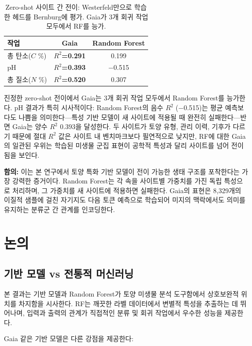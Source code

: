 \documentclass[11pt,a4paper]{article}
\begin{document}
\begin{table}[H]
\centering
\caption{Zero-shot 사이트 간 전이: Westerfeld만으로 학습한 헤드를 Bernburg에 평가. Gaia가 3개 회귀 작업 모두에서 RF를 능가.}
\label{tab:bernburg_zs}
\begin{tabular}{lcc}
\toprule
\textbf{작업} & \textbf{Gaia} & \textbf{Random Forest} \\
\midrule
총 탄소($C$ \%) & \textbf{$R^2$=0.291} & 0.199 \\
pH & \textbf{$R^2$=0.393} & $-$0.515 \\
총 질소($N$ \%) & \textbf{$R^2$=0.520} & 0.307 \\
\bottomrule
\end{tabular}
\end{table}

진정한 zero-shot 전이에서 Gaia는 3개 회귀 작업 모두에서 Random Forest를 능가한다. pH 결과가 특히 시사적이다: Random Forest의 음수 $R^2$ ($-$0.515)는 평균 예측보다도 나쁨을 의미한다---특성 기반 모델이 새 사이트에 적용될 때 완전히 실패한다---반면 Gaia는 양수 $R^2$ 0.393을 달성한다. 두 사이트가 토양 유형, 관리 이력, 기후가 다르기 때문에 절대 $R^2$ 값은 사이트 내 벤치마크보다 필연적으로 낮지만, RF에 대한 Gaia의 일관된 우위는 학습된 미생물 군집 표현이 공학적 특성과 달리 사이트를 넘어 전이됨을 보인다.

\textbf{함의:} 이는 본 연구에서 토양 특화 기반 모델이 전이 가능한 생태 구조를 포착한다는 가장 강력한 증거이다. Random Forest는 각 속을 사이트별 가중치를 가진 독립 특성으로 처리하며, 그 가중치를 새 사이트에 적용하면 실패한다. Gaia의 표현은 8,329개의 이질적 샘플에 걸친 자기지도 다음 토큰 예측으로 학습되어 미지의 맥락에서도 의미를 유지하는 분류군 간 관계를 인코딩한다.

\section{논의}

\subsection{기반 모델 vs 전통적 머신러닝}

본 결과는 기반 모델과 Random Forest가 토양 미생물 분석 도구함에서 상호보완적 위치를 차지함을 시사한다. RF는 깨끗한 라벨 데이터에서 변별적 특성을 추출하는 데 뛰어나며, 입력과 출력의 관계가 직접적인 분류 및 회귀 작업에서 우수한 성능을 제공한다.

Gaia 같은 기반 모델은 다른 강점을 제공한다:
\end{document}
